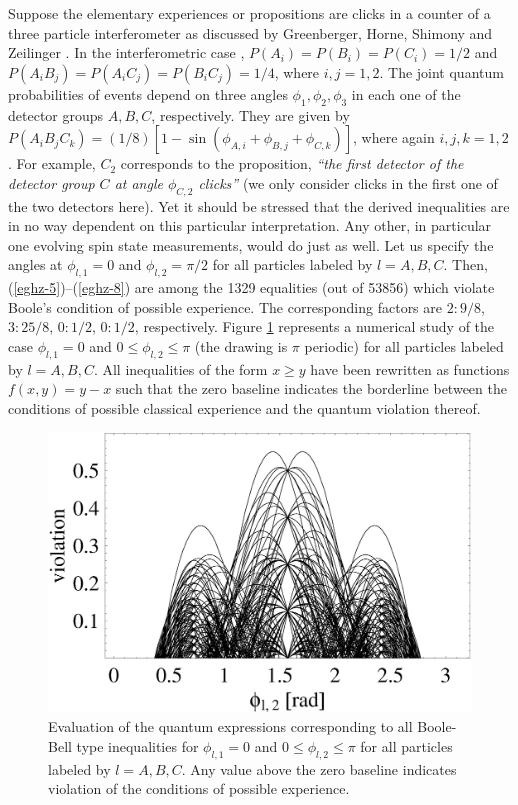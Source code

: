 Suppose the elementary experiences or propositions are
clicks in a counter of a three particle interferometer as  discussed by
Greenberger, Horne, Shimony and Zeilinger \cite{ghsz}.
In the interferometric case \cite{ghsz},
$P(A_i)=P(B_i)=P(C_i)=1/2$ and
$P(A_iB_j)=P(A_iC_j)=P(B_iC_j)=1/4$, where $i,j=1,2$.
The joint quantum probabilities of events depend on three angles
$\phi_1,\phi_2,\phi_3$ in each one of the detector groups $A,B,C$, respectively.
They are given by
$
P(A_iB_jC_k)=
(1/8)[1-\sin (\phi_{A,i}+\phi_{B,j}+\phi_{C,k})]
$, where again $i,j,k =1,2$.
For example, $C_2$ corresponds to the  proposition,
{\em ``the first detector of the detector group $C$ at angle $\phi_{C,2}$ clicks''}
(we only consider clicks in the first one of the two detectors here).
Yet it should be stressed that the derived inequalities are in no way dependent
on this particular interpretation. Any other, in particular one evolving spin state measurements,
would do just as well.
Let us specify the angles at $\phi_{l,1}=0$ and $\phi_{l,2}=\pi /2$
for all particles labeled by $l=A,B,C$.
Then,
(\ref{eghz-5})--(\ref{eghz-8})
are among the  1329 equalities (out of 53856) which
violate  Boole's condition of possible experience.
The corresponding
factors are
 $2 :  9/8$,
 $3 :  25/8$,
 $0 :  1/2$,
 $0 :  1/2$,
respectively.
Figure   \ref{2000-poly-f3} represents a numerical study of the  case
$\phi_{l,1}=0$ and
$0\le \phi_{l,2}  \le \pi$ (the drawing is $\pi$ periodic)
for all particles labeled by $l=A,B,C$.
All inequalities of the form $x\ge y$ have been rewritten as functions
$f(x,y)=y-x$ such that the zero baseline indicates
the borderline between the conditions of possible classical experience and
the quantum violation thereof.
\begin{figure}
 \includegraphics[width=15cm]{2000-poly-f1.eps}
 \caption{Evaluation of the quantum expressions corresponding to all
Boole-Bell type inequalities for
$\phi_{l,1}=0$ and
$0\le \phi_{l,2}  \le \pi$
for all particles labeled by $l=A,B,C$.
Any value above the zero baseline indicates violation of the conditions
of possible experience.}
\label{2000-poly-f3}
\end{figure}
